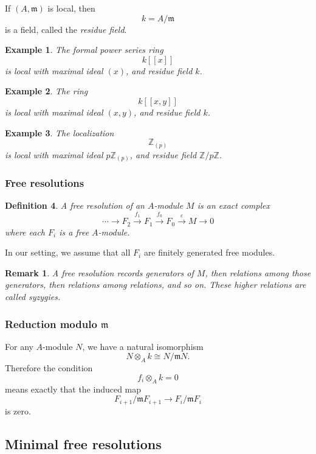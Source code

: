 \documentclass[12pt,a4paper]{article}
\theoremstyle{notespace}
\newtheorem{definition}{Definition}[section]
\newtheorem{remark}{Remark}[section]
\newtheorem{example}[definition]{Example}
\newcommand{\ZZ}{\mathbb{Z}}
\newcommand{\m}{\mathfrak m}
\begin{document}
If \((A,\m)\) is local, then
\[
k=A/\m
\]
is a field, called the \emph{residue field}.

\begin{example}
	The formal power series ring
	\[
	k[[x]]
	\]
	is local with maximal ideal \((x)\), and residue field \(k\).
\end{example}

\begin{example}
	The ring
	\[
	k[[x,y]]
	\]
	is local with maximal ideal \((x,y)\), and residue field \(k\).
\end{example}

\begin{example}
	The localization
	\[
	\ZZ_{(p)}
	\]
	is local with maximal ideal \(p\ZZ_{(p)}\), and residue field \(\ZZ/p\ZZ\).
\end{example}

\subsubsection{Free resolutions}

\begin{definition}
	A \emph{free resolution} of an \(A\)-module \(M\) is an exact complex
	\[
	\cdots \longrightarrow F_2 \xrightarrow{f_1} F_1 \xrightarrow{f_0} F_0 \xrightarrow{\varepsilon} M \longrightarrow 0
	\]
	where each \(F_i\) is a free \(A\)-module.
\end{definition}

In our setting, we assume that all \(F_i\) are finitely generated free modules.

\begin{remark}
	A free resolution records generators of \(M\), then relations among those generators, then relations among relations, and so on. These higher relations are called syzygies.
\end{remark}

\subsubsection{Reduction modulo \(\m\)}

For any \(A\)-module \(N\), we have a natural isomorphism
\[
N\otimes_A k \cong N/\m N.
\]
Therefore the condition
\[
f_i\otimes_A k = 0
\]
means exactly that the induced map
\[
F_{i+1}/\m F_{i+1}\longrightarrow F_i/\m F_i
\]
is zero.

\subsection{Minimal free resolutions}
\end{document}
